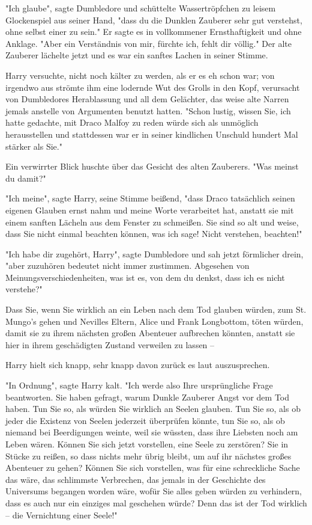 {"Ich glaube", sagte Dumbledore und schüttelte Wassertröpfchen zu leisem Glockenspiel aus seiner Hand, "dass du die Dunklen Zauberer sehr gut verstehst, ohne selbst einer zu sein." Er sagte es in vollkommener Ernsthaftigkeit und ohne Anklage. "Aber ein Verständnis von mir, fürchte ich, fehlt dir völlig." Der alte Zauberer lächelte jetzt und es war ein sanftes Lachen in seiner Stimme.

Harry versuchte, nicht noch kälter zu werden, als er es eh schon war; von irgendwo aus strömte ihm eine lodernde Wut des Grolls in den Kopf, verursacht von Dumbledores Herablassung und all dem Gelächter, das weise alte Narren jemals anstelle von Argumenten benutzt hatten. "Schon lustig, wissen Sie, ich hatte gedachte, mit Draco Malfoy zu reden würde sich als unmöglich herausstellen und stattdessen war er in seiner kindlichen Unschuld hundert Mal stärker als Sie."

Ein verwirrter Blick huschte über das Gesicht des alten Zauberers. "Was meinst du damit?"

"Ich meine", sagte Harry, seine Stimme beißend, "dass Draco tatsächlich seinen eigenen Glauben ernst nahm und meine Worte verarbeitet hat, anstatt sie mit einem sanften Lächeln aus dem Fenster zu schmeißen. Sie sind so alt und weise, dass Sie nicht einmal beachten können, was ich sage! Nicht verstehen, beachten!"

"Ich habe dir zugehört, Harry", sagte Dumbledore und sah jetzt förmlicher drein, "aber zuzuhören bedeutet nicht immer zustimmen. Abgesehen von Meinungsverschiedenheiten, was ist es, von dem du denkst, dass ich es nicht verstehe?"

Dass Sie, wenn Sie wirklich an ein Leben nach dem Tod glauben würden, zum St. Mungo's gehen und Nevilles Eltern, Alice und Frank Longbottom, töten würden, damit sie zu ihrem nächsten großen Abenteuer aufbrechen könnten, anstatt sie hier in ihrem geschädigten Zustand verweilen zu lassen --

Harry hielt sich knapp, sehr knapp davon zurück es laut auszusprechen.

"In Ordnung", sagte Harry kalt. "Ich werde also Ihre ursprüngliche Frage beantworten. Sie haben gefragt, warum Dunkle Zauberer Angst vor dem Tod haben. Tun Sie so, als würden Sie wirklich an Seelen glauben. Tun Sie so, als ob jeder die Existenz von Seelen jederzeit überprüfen könnte, tun Sie so, als ob niemand bei Beerdigungen weinte, weil sie wüssten, dass ihre Liebsten noch am Leben wären. Können Sie sich jetzt vorstellen, eine Seele zu zerstören? Sie in Stücke zu reißen, so dass nichts mehr übrig bleibt, um auf ihr nächstes großes Abenteuer zu gehen? Können Sie sich vorstellen, was für eine schreckliche Sache das wäre, das schlimmste Verbrechen, das jemals in der Geschichte des Universums begangen worden wäre, wofür Sie alles geben würden zu verhindern, dass es auch nur ein einziges mal geschehen würde? Denn das ist der Tod wirklich -- die Vernichtung einer Seele!"

}
